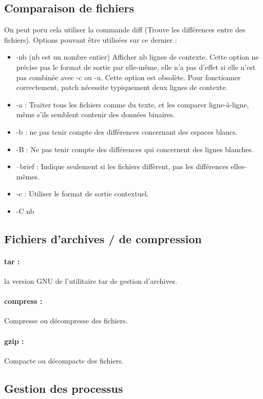 \documentclass{article}[12pt]
\begin{document}
\subsection{ Comparaison de fichiers}
On peut poru cela utiliser la commande diff (Trouve les différences entre des fichiers). Options pouvant être utilisées sur ce dernier :
\begin{itemize}
\item -nb (nb est un nombre entier) Afficher nb lignes de contexte. Cette option ne précise pas le format de sortie par elle-même, elle n'a pas d'effet si elle n'est pas combinée avec -c ou -u. Cette option est obsolète. Pour fonctionner correctement, patch nécessite typiquement deux lignes de contexte.
\item -a : Traiter tous les fichiers comme du texte, et les comparer ligne-à-ligne, même s'ils semblent contenir des données binaires.
\item -b : ne pas tenir compte des différences concernant des espaces blancs.
\item -B : Ne pas tenir compte des différences qui concernent des lignes blanches.
\item --brief : Indique seulement si les fichiers diffèrent, pas les différences elles-mêmes.
\item -c : Utiliser le format de sortie contextuel.
\item -C nb
\end{itemize}
\subsection{Fichiers d'archives / de compression}
\paragraph{tar : } la version GNU de l'utilitaire tar de gestion d'archives.  
\paragraph{compress : } Compresse ou décompresse des fichiers.
\paragraph{gzip : } Compacte ou décompacte des fichiers. 
\subsection{Gestion des processus}
\end{document}
